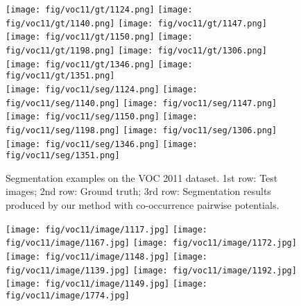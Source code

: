 \documentclass[10pt,3p]{elsarticle}
\begin{document}
\begin{figure}[!t]
	\texttt{[image: fig/voc11/gt/1124.png]}
     \texttt{[image: fig/voc11/gt/1140.png]}     
	\texttt{[image: fig/voc11/gt/1147.png]}
	\texttt{[image: fig/voc11/gt/1150.png]}
     \texttt{[image: fig/voc11/gt/1198.png]}
     \texttt{[image: fig/voc11/gt/1306.png]}   
     \texttt{[image: fig/voc11/gt/1346.png]} 
     \texttt{[image: fig/voc11/gt/1351.png]}\\
 
       
     \texttt{[image: fig/voc11/seg/1124.png]}
     \texttt{[image: fig/voc11/seg/1140.png]}     
	\texttt{[image: fig/voc11/seg/1147.png]}
    \texttt{[image: fig/voc11/seg/1150.png]}
     \texttt{[image: fig/voc11/seg/1198.png]}
     \texttt{[image: fig/voc11/seg/1306.png]}   
     \texttt{[image: fig/voc11/seg/1346.png]} 
     \texttt{[image: fig/voc11/seg/1351.png]}\\


\caption{Segmentation examples on the VOC 2011 dataset. 1st row: Test images; 2nd row: Ground truth; 
3rd row: Segmentation results produced by our method with co-occurrence pairwise potentials. }
    \label{fig:seg_voc11}      
\end{figure}\begin{figure}[!t]
\centering
	\texttt{[image: fig/voc11/image/1117.jpg]}
     \texttt{[image: fig/voc11/image/1167.jpg]}     
	\texttt{[image: fig/voc11/image/1172.jpg]}
     \texttt{[image: fig/voc11/image/1148.jpg]}
     \texttt{[image: fig/voc11/image/1139.jpg]}   
     \texttt{[image: fig/voc11/image/1192.jpg]}
     \texttt{[image: fig/voc11/image/1149.jpg]} 
     \texttt{[image: fig/voc11/image/1774.jpg]}\\
     

\end{figure}
\end{document}
